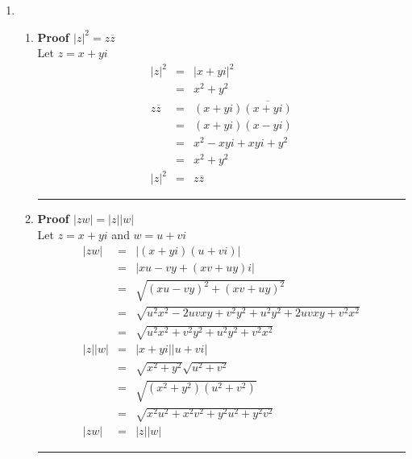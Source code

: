 \documentclass{article}%
\newcommand\abs[1]{\left|#1\right|}
\newenvironment{proof}[1][]{\begin{samepage}\textbf{Proof #1} }{\rule{0.5em}{0.5em} \end{samepage}}
\begin{document}
\begin{enumerate}
\begin{enumerate}[label*=\arabic*.]
\begin{enumerate}[label=\alph*]
        \end{enumerate}
        \item
        \begin{enumerate}[label=\alph*]
            \item
            \begin{proof}[$\abs{z}^2=z\overline{z}$]
                \\ Let $z=x+yi$
                \begin{eqnarray*}
                    \abs{z}^2&=&\abs{x+yi}^2 \\
                             &=&x^2+y^2 \\
                    z\overline{z}&=&(x+yi)\overline{(x+yi)} \\
                                 &=&(x+yi)(x-yi) \\
                                 &=&x^2-xyi+xyi+y^2 \\
                                 &=&x^2+y^2 \\
                    \abs{z}^2&=&z\overline{z}
                \end{eqnarray*}
            \end{proof}
            \item
            \begin{proof}[$\abs{zw}=\abs{z}\abs{w}$]
                \\ Let $z=x+yi$ and $w=u+vi$
                \begin{eqnarray*}
                    \abs{zw}&=&\abs{(x+yi)(u+vi)} \\
                            &=&\abs{xu-vy+(xv+uy)i} \\
                            &=&\sqrt{(xu-vy)^2+(xv+uy)^2} \\
                            &=&\sqrt{u^2x^2-2uvxy+v^2y^2+u^2y^2+2uvxy+v^2x^2} \\
                            &=&\sqrt{u^2x^2+v^2y^2+u^2y^2+v^2x^2} \\
                    \abs{z}\abs{w}&=&\abs{x+yi}\abs{u+vi} \\
                                  &=&\sqrt{x^2+y^2}\sqrt{u^2+v^2} \\
                                  &=&\sqrt{(x^2+y^2)(u^2+v^2)} \\
                                  &=&\sqrt{x^2u^2+x^2v^2+y^2u^2+y^2v^2} \\
                    \abs{zw}&=&\abs{z}\abs{w}
                \end{eqnarray*}

\end{proof}
\end{enumerate}
\end{enumerate}
\end{enumerate}
\end{document}
